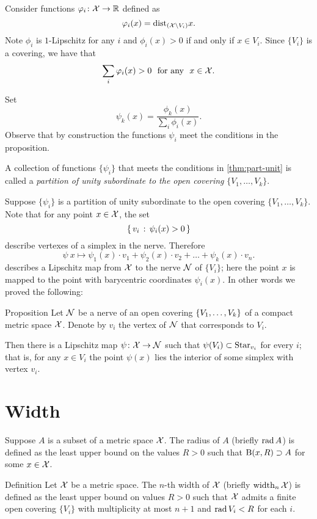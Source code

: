 Consider functions $\varphi_i\colon{\mathcal{X}}\to\mathbb{R}$ defined as
$$\varphi_i(x)=\mathrm{dist}_{({\mathcal{X}}\backslash V_i)} x.$$
Note $\phi_i$ is $1$-Lipschitz
for any $i$
and $\phi_i(x)>0$ if and only if $x\in V_i$.
Since $\{V_i\}$ is a covering, we have that
$$\sum_i\varphi_i(x)>0\ \ \text{for any}\ \ x\in {\mathcal{X}}.$$

Set 
$$\psi_k(x)=\frac{\phi_k(x)}{\sum_i\phi_i(x)}.$$
Observe that by construction the functions $\psi_i$ meet the conditions in the proposition.
\qedsf

A collection of functions $\{\psi_i\}$ that meets the conditions in \ref{thm:part-unit} is called 
a \emph{partition of unity subordinate to the open covering} $\{V_1,\dots,V_k\}$.

Suppose $\{\psi_i\}$ is  
a partition of unity subordinate to the open covering $\{V_1,\dots,V_k\}$.
Note that for any point $x\in {\mathcal{X}}$, the set
$$\left\{\,{v_i}\,:\,{\psi_i(x)>0}\,\right\}$$
describe vertexes of a simplex in the nerve.
Therefore 
$$\psi\:x\mapsto \psi_1(x)\cdot v_1+\psi_2(x)\cdot v_2+\dots+\psi_k(x)\cdot v_n.$$
describes a Lipschitz map from ${\mathcal{X}}$ to the nerve $\mathcal{N}$ of $\{V_i\}$;
here the point $x$ is mapped to the point with barycentric coordinates $\psi_i(x)$.
In other words we proved the following:

\begin{thm}{Proposition}\label{prop:space->nerve}
Let $\mathcal{N}$ be a nerve of an open covering $\{V_1,\z\dots,V_k\}$ of a compact metric space $\mathcal{X}$.
Denote by $v_i$ the vertex of $\mathcal{N}$ that corresponds to $V_i$.

Then there is a Lipschitz map $\psi\colon\mathcal{X}\to\mathcal{N}$ such that $\psi(V_i)\z\subset\Star_{v_i}$ for every $i$;
that is, for any $x\in V_i$ the point $\psi(x)$ lies the interior of some simplex with vertex $v_i$.
\end{thm}


\section{Width}

Suppose $A$ is a subset of a metric space $\mathcal{X}$.
The radius of $A$ (briefly $\mathop{\rm rad}\nolimits A$) is defined as the least upper bound on the values $R>0$ such that $\mathrm{B}{}(x,R)\supset A$ for some $x\in \mathcal{X}$.

\begin{thm}{Definition}\label{def:width}
Let $\mathcal{X}$ be a metric space.
The $n$-th width of $\mathcal{X}$ (briefly $\operatorname{\rm width}\nolimits_n\mathcal{X}$) is defined as the least upper bound on values $R>0$ such that $\mathcal{X}$ admits a finite open covering $\{V_i\}$ with multiplicity at most $n+1$ and $\mathop{\rm rad}\nolimits V_i< R$ for each $i$.
\end{thm}

